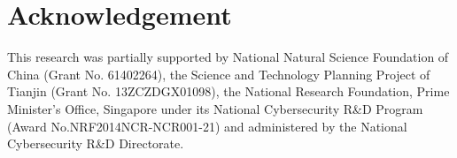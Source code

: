 \section{Acknowledgement}
This research was partially supported by  National Natural
Science Foundation of China (Grant No. 61402264), the
Science and Technology Planning Project of Tianjin (Grant
No. 13ZCZDGX01098), the National Research Foundation, Prime Minister’s Office, Singapore under its National Cybersecurity 
R\&D Program (Award No.NRF2014NCR-NCR001-21) and administered by the National Cybersecurity R\&D Directorate. 
